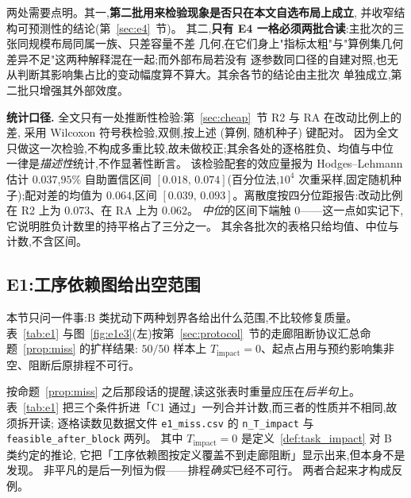 \documentclass[manuscript,screen,review]{acmart}
\newcommand{\NPairs}{50}
\newcommand{\PassMiss}{\NPairs/\NPairs}      %
\newcommand{\RAStabMean}{0.064}      %
\newcommand{\RAStabMeanNet}{0.073}  %
\begin{document}
两处需要点明。其一,\textbf{第二批用来检验现象是否只在本文自选布局上成立},
并收窄结构可预测性的结论(第~\ref{sec:e4}~节)。
其二,\textbf{只有 E4 一格必须两批合读}:主批次的三张同规模布局同属一族、只差容量不差
几何,在它们身上"指标太粗"与"算例集几何差异不足"这两种解释混在一起;而外部布局若没有
逐参数同口径的自建对照,也无从判断其影响集占比的变动幅度算不算大。其余各节的结论由主批次
单独成立,第二批只增强其外部效度。

\textbf{统计口径.}
全文只有一处推断性检验:第~\ref{sec:cheap}~节 R2 与 RA 在改动比例上的差,
采用 Wilcoxon 符号秩检验,双侧,按上述 (算例, 随机种子) 键配对。
因为全文只做这一次检验,不构成多重比较,故未做校正;其余各处的逐格胜负、均值与中位
一律是\emph{描述性}统计,不作显著性断言。
该检验配套的效应量报为 Hodges--Lehmann 估计 \(0.037\),\(95\%\) 自助置信区间
\([0.018,\,0.074]\)(百分位法,\(10^4\) 次重采样,固定随机种子);配对差的均值为
\(\RAStabMean\),区间 \([0.039,\,0.093]\)。离散度按四分位距报告:改动比例在 R2 上为
\(0.073\)、在 RA 上为 \(0.062\)。%
\emph{中位}的区间下端触 \(0\)——这一点如实记下,它说明胜负计数里的持平格占了三分之一。
其余各批次的表格只给均值、中位与计数,不含区间。

\subsection{E1:工序依赖图给出空范围}
\label{sec:e1}

本节只问一件事:B 类扰动下两种划界各给出什么范围,不比较修复质量。
表~\ref{tab:e1} 与图~\ref{fig:e1e3}(左)按第~\ref{sec:protocol}~节的走廊阻断协议汇总命题~\ref{prop:miss} 的扩样结果:
\(\PassMiss\) 样本上 \(T_{\mathrm{impact}}=0\)、起点占用与预约影响集非空、阻断后原排程不可行。

按命题~\ref{prop:miss} 之后那段话的提醒,读这张表时重量应压在\emph{后半句}上。
表~\ref{tab:e1} 把三个条件折进「C1 通过」一列合并计数,而三者的性质并不相同,故须拆开读;
逐格读数见数据文件 \texttt{e1\_miss.csv} 的
\texttt{n\_T\_impact} 与 \texttt{feasible\_after\_block} 两列。
其中 \(T_{\mathrm{impact}}=0\) 是定义~\ref{def:task_impact} 对 B 类约定的推论,
它把「工序依赖图按定义覆盖不到走廊阻断」显示出来,但本身不是发现。
非平凡的是后一列恒为假——排程\emph{确实}已经不可行。
两者合起来才构成反例。
\end{document}
